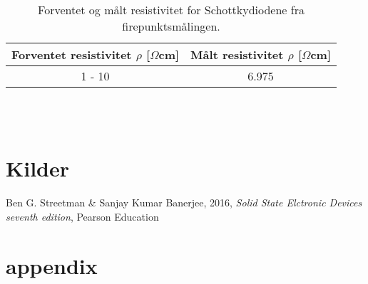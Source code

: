 \documentclass{article}
\begin{document}
\begin{table}[ht]
    \centering
    \caption{Forventet og målt resistivitet for Schottkydiodene fra firepunktsmålingen.}
    \vspace{2mm}
    \label{tab:schottkyresistivitet}
    \begin{tabular}{|c|c|}
        \hline
        Forventet resistivitet $\rho$ [$\Omega$cm] & Målt resistivitet $\rho$ [$\Omega$cm]  \\
        \hline \hline
        1 - 10 & 6.975 \\
        \hline
    \end{tabular} \\
    \hspace{0pt}\\
\end{table}
\fi


\vspace{1cm}

\section{Kilder} \label{sec:Kilder}

    \begin{thebibliography}{}

    Ben G. Streetman \& Sanjay Kumar Banerjee, 2016, \textit{Solid State Elctronic Devices seventh edition}, Pearson Education


    \end{thebibliography}



\appendix
\section{appendix}



\end{document}
